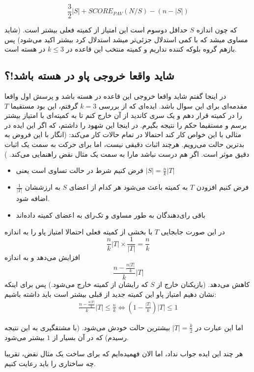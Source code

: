 \documentclass[12pt]{article}
\begin{document}
    \[
    \frac{3}{2}|S| + SCORE_{PAV} (N / S)  - (n - |S|)
    \]

    که چون اندازه $S$ حداقل
    دوسوم است این امتیاز از کمیته فعلی بیشتر است.
    (شاید مساوی میشد که با کمی استدلال جزئی‌تر میشد استدلال کرد بیشتر اکید می‌شود)
    پس بازهم گروه بلوکه کننده نداریم و کمیته منتخب این قاعده در
    $k\le 3$
    در هسته است.

\subsection{شاید واقعا خروجی پاو در هسته باشد!؟}
در اینجا گفتم شاید واقعا خروجی این قاعده در هسته باشد و پرسش اول واقعا مقدمه‌ای
برای این سوال باشد. ایده‌ای که از بررسی $k=3$
گرفتم، این بود مستقیما $T$
را در کمیته قرار دهم و یک سری کاندید از آن خارج کنم تا به کمیته‌ای با امتیاز 
بیشتر برسم و مستقیما حکم را نتیجه بگیرم.
در اینجا این شهود را داشتم، که اگر این ایده در مثالی با این خواص کار کند
احتمالا در تمام حالات کار می‌کند:
(انگار با این فروض به بدترین حالت می‌رویم. هرچند اثبات دقیقی نیست، اما
برای حرکت به سمت یک اثبات دقیق موثر است.
اگر هم درست نباشد مارا به سمت یک مثال نقض راهنمایی می‌کند.
)

\begin{itemize}
    \item فرض کنیم شرط در حالت تساوی است یعنی $|S| = \frac{n}{k}|T|$
    \item فرض کنیم افزودن $T$ به کمیته باعث می‌شود هر کدام از اعضای $S$
    به ارزششان $\frac{1}{|T|}$
    اضافه شود.
    \item باقی رای‌دهندگان به طور مساوی و تک‌رای به اعضای کمیته داده‌اند
\end{itemize}

در این صورت جابجایی $T$
با بخشی از کمیته فعلی احتمالا امتیاز پاو را به اندازه
\[
\frac{n}{k} |T| \times \frac{1}{|T|} = \frac{n}{k}
\]
افزایش می‌دهد و به اندازه 
\[
\frac{n - \frac{n |T|}{k}}{k} |T|
\]
کاهش می‌دهد. (بازیکنان خارج از $S$ که رایشان از کمیته خارج می‌شود.)
پس برای اینکه نشان دهیم امتیاز پاو این کمیته جدید از قبلی بیشتر است
باید داشته باشیم:
\begin{align*}
    \frac{n - \frac{n |T|}{k}}{k} |T| \le \frac{n}{k}
        \Leftrightarrow (1 - \frac{|T|}{k}) |T| \le 1
\end{align*}

اما این عبارت در $|T| = \frac{k}{2}$
بیشترین حالت خودش می‌شود. (با مشتقگیری به این نتیجه رسیدم)
که در آن بسیار از $1$
بیشتر می‌شود.

هر چند این ایده جواب نداد، اما الان فهمیده‌ایم که برای ساخت
یک مثال نقض، تقریبا چه ساختاری را باید رعایت کنیم.
\end{document}
